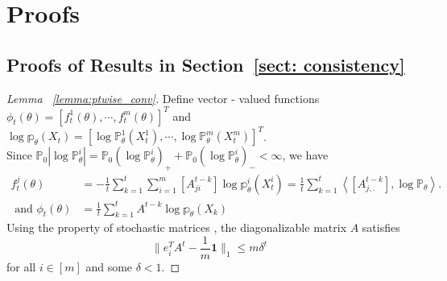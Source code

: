 \documentclass[twoside,11pt]{article}
\numberwithin{equation}{section}
\newcommand\bP{\mathbb{P}}
\newcommand\bp{\mathbb{p}}
\newcommand{\ones}{\mathbf{1}}
\begin{document}
{\FloatBarrier
\section{Proofs}
\label{app:proofs}
\subsection{Proofs of Results in Section~\ref{sect: consistency}} \label{app:consistency}

\begin{proof}[Lemma ~\ref{lemma:ptwise_conv}]
Define vector - valued functions $\phi_t(\theta) = \left[f_t^1(\theta), \cdots, f_t^m(\theta) \right]^T$ and $\log \bp_\theta(X_t) = \left[\log \bP_\theta^1(X_t^1), \cdots, \log \bP_\theta^m (X_t^m)\right]^T$.   \\
Since $\bP_0 |\log \bP_\theta^i| = \bP_0 (\log \bP_\theta^i)_{+} + \bP_0 (\log \bP_\theta^i)_{-} < \infty$, we have
\begin{align*}
f_t^j(\theta) &= -\frac{1}{t} \sum_{k = 1}^t \sum_{i = 1}^m [A^{t-k}_{ji}] \log \bp_\theta^i(X_t^i) = \frac{1}{t} \sum_{k = 1}^t \left< [A^{t-k}_{j,.}] ,\log \bP_\theta\right>. \\
\mbox{ and } \phi_t(\theta) &= \frac{1}{t} \sum_{k = 1}^t A^{t-k} \log \bp_\theta(X_k) 
\end{align*}
\iffalse
Using the property of stochastic matrices \citep{rosenthal1995convergence}, the diagonalizable matrix $A$ satisfies 
\begin{equation*}
    \|e_i^T A^t - \frac{1}{m} \ones \|_1 \leq m \delta^t
\end{equation*}
for all $i \in [m]$ and some $\delta < 1$. 


\end{proof}}
\end{document}
